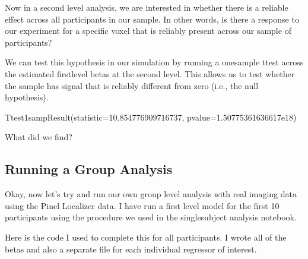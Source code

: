 \documentclass[letterpaper,10pt,english]{sphinxmanual}
\begin{document}
\noindent{}

Now in a second level analysis, we are interested in whether there is a reliable effect across all participants in our sample. In other words, is there a response to our experiment for a specific voxel that is reliably present across our sample of participants?

We can test this hypothesis in our simulation by running a one\sphinxhyphen{}sample ttest across the estimated first\sphinxhyphen{}level betas at the second level. This allows us to test whether the sample has signal that is reliably different from zero (i.e., the null hypothesis).

\begin{sphinxVerbatim}[commandchars=\\\{\}]
 
\end{sphinxVerbatim}

\begin{sphinxVerbatim}[commandchars=\\\{\}]
Ttest\PYGZus{}1sampResult(statistic=10.854776909716737, pvalue=1.50775361636617e\PYGZhy{}18)
\end{sphinxVerbatim}

What did we find?


\subsection{Running a Group Analysis}
\label{\detokenize{content/Group_Analysis:running-a-group-analysis}}
Okay, now let’s try and run our own group level analysis with real imaging data using the Pinel Localizer data. I have run a first level model for the first 10 participants using the procedure we used in the single\sphinxhyphen{}subject analysis notebook.

Here is the code I used to complete this for all participants. I wrote all of the betas and also a separate file for each individual regressor of interest.
\end{document}
